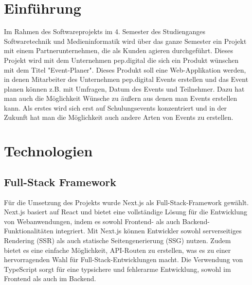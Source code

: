 \documentclass[a4paper,12pt]{article}
\begin{document}
\newpage


\tableofcontents

\newpage

\listoffigures

\newpage

\listoftables

\newpage


\section{Einführung}
Im Rahmen des Softwareprojekts im 4. Semester des Studienganges Softwaretechnik und Medieninformatik wird über das ganze Semester ein Projekt mit einem Partnerunternehmen, die als Kunden agieren durchgeführt. Dieses Projekt wird mit dem Unternehmen pep.digital die sich ein Produkt wünschen mit dem Titel "Event-Planer". Dieses Produkt soll eine Web-Applikation werden, in denen Mitarbeiter des Unternehmen pep.digital Events erstellen und das Event planen können z.B. mit Umfragen, Datum des Events und Teilnehmer. Dazu hat man auch die Möglichkeit Wünsche zu äußern aus denen man Events erstellen kann. Als erstes wird sich erst auf Schulungsevents konzentriert und in der Zukunft hat man die Möglichkeit auch andere Arten von Events zu erstellen.


\section{Technologien}


\subsection{Full-Stack Framework}
Für die Umsetzung des Projekts wurde \gls{Next.js} als Full-Stack-Framework gewählt. Next.js basiert auf \gls{React} und bietet eine vollständige Lösung für die Entwicklung von Webanwendungen, indem es sowohl Frontend- als auch Backend-Funktionalitäten integriert. Mit Next.js können Entwickler sowohl serverseitiges Rendering (SSR) als auch statische Seitengenerierung (SSG) nutzen. Zudem bietet es eine einfache Möglichkeit, API-Routen zu erstellen, was es zu einer hervorragenden Wahl für Full-Stack-Entwicklungen macht. Die Verwendung von \gls{TypeScript} sorgt für eine typsichere und fehlerarme Entwicklung, sowohl im \gls{Frontend} als auch im Backend.
\end{document}
